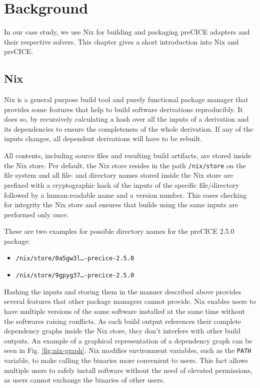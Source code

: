 \documentclass[conference,final,a4paper]{IEEEtran}
\begin{document}
\section{Background}

In our case study, we use Nix for building and packaging preCICE adapters and their respective solvers.
This chapter gives a short introduction into Nix and preCICE.

\subsection{Nix}

Nix is a general purpose build tool and purely functional package manager that provides some features that help to build software derivations reproducibly.
It does so, by recursively calculating a hash over all the inputs of a derivation and its dependencies to ensure the completeness of the whole derivation.
If any of the inputs changes, all dependent derivations will have to be rebuilt.

All contents, including source files and resulting build artifacts, are stored inside the Nix store.
Per default, the Nix store resides in the path \texttt{/nix/store} on the file system and all file- and directory names stored inside the Nix store are prefixed with a cryptographic hash of the inputs of the specific file/directory followed by a human-readable name and a version number.
This eases checking for integrity the Nix store and ensures that builds using the same inputs are performed only once.

These are two examples for possible directory names for the preCICE 2.5.0 package:

\begin{itemize}
  \item \texttt{/nix/store/0a5gw3l\ldots-precice-2.5.0}
  \item \texttt{/nix/store/9gpyg37\ldots-precice-2.5.0}
\end{itemize}

Hashing the inputs and storing them in the manner described above provides several features that other package managers cannot provide.
Nix enables users to have multiple versions of the same software installed at the same time without the softwares raising conflicts.
As each build output references their complete dependency graphs inside the Nix store, they don't interfere with other build outputs.
An example of a graphical representation of a dependency graph can be seen in Fig. \ref{fig:nix-graph}.
Nix modifies environment variables, such as the \texttt{PATH} variable, to make calling the binaries more convenient to users.
This fact allows multiple users to safely install software without the need of elevated permissions, as users cannot exchange the binaries of other users.
\end{document}
